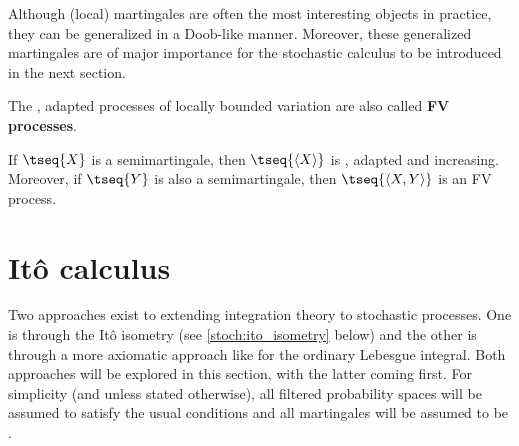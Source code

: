     Although (local) martingales are often the most interesting objects in practice, they can be generalized in a Doob-like manner. Moreover, these generalized martingales are of major importance for the stochastic calculus to be introduced in the next section.
    \begin{remark}
        The \cdlgg, adapted processes of locally bounded variation are also called \textbf{FV processes}.
    \end{remark}

    \begin{property}
        If $\tseq{X}$ is a semimartingale, then $\tseq{\langle X \rangle}$ is \cdlgg, adapted and increasing. Moreover, if $\tseq{Y}$ is also a semimartingale, then $\tseq{\langle X,Y \rangle}$ is an FV process.
    \end{property}


\section{It\^o calculus}\label{section:stochastic_integral}

    Two approaches exist to extending integration theory to stochastic processes. One is through the It\^o isometry (see \cref{stoch:ito_isometry} below) and the other is through a more axiomatic approach like for the ordinary Lebesgue integral. Both approaches will be explored in this section, with the latter coming first. For simplicity (and unless stated otherwise), all filtered probability spaces will be assumed to satisfy the usual conditions and all martingales will be assumed to be \cdlgg.

